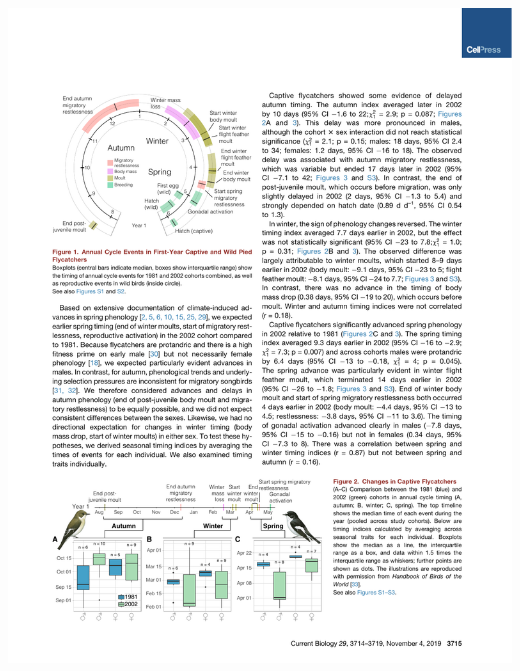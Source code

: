 \documentclass[a4paper, twoside]{templates/ociamthesis}
\begin{document}
\begin{center}\includegraphics[width=1\linewidth]{pdf_chapters/pied/pied_crop_Part02} \end{center}
\end{document}
